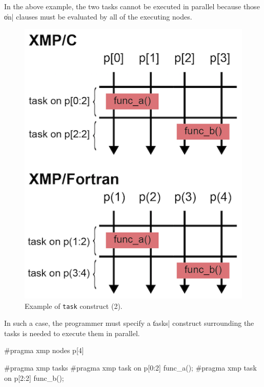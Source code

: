 In the above example, the two tasks cannot be executed in parallel
because those \|on| clauses must be evaluated by all of the executing
nodes.

\begin{figure}
  \centering
  \includegraphics{figs/task_noparallel.png}
  \caption{Example of {\tt task} construct (2).}
\end{figure}

In such a case, the programmer must specify a \|tasks| construct
surrounding the tasks is needed to execute them in parallel.

\begin{XCexample}
#pragma xmp nodes p[4]

#pragma xmp tasks
{
#pragma xmp task on p[0:2]
{
  func_a();
}
#pragma xmp task on p[2:2]
{
  func_b();
}
}
\end{XCexample}


